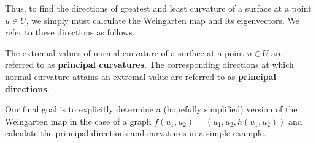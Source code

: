         	Thus, to find the directions of greatest and least curvature of a surface at a point $u \in U$, we simply must calculate the Weingarten map and its eigenvectors. We refer to these directions as follows.
        	
        	\begin{defn}
        		The extremal values of normal curvature of a surface at a point  $u\in U$
        		are referred to as \textbf{principal curvatures}. The corresponding directions at which normal curvature attains an extremal value are referred to as \textbf{principal directions}.
        	\end{defn}
        	
        	Our final goal is to explicitly determine a (hopefully simplified) version of the Weingarten map in the case of a graph $f(u_1,u_2) = (u_1,u_2, h(u_1,u_2))$ and calculate
        	the principal directions and curvatures in a simple example.
        	        		
